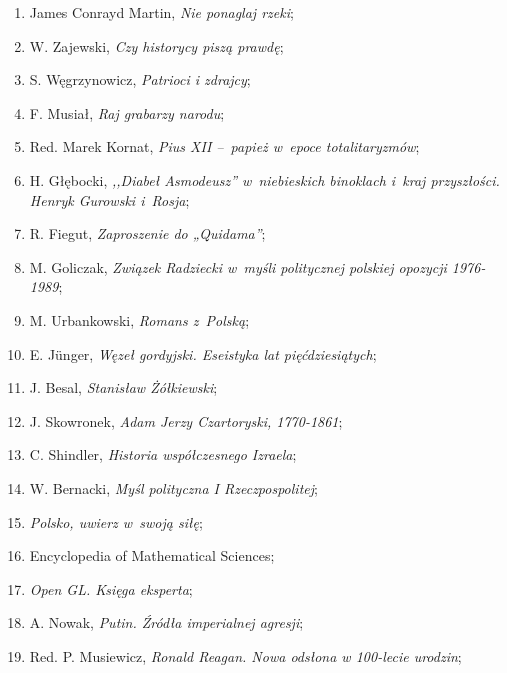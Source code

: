 \documentclass[a4paper,11pt]{article}
\begin{document}
\begin{enumerate}
\item James Conrayd Martin, \emph{Nie ponaglaj rzeki};

\item W. Zajewski, \emph{Czy historycy piszą prawdę};

\item S. Węgrzynowicz, \emph{Patrioci i zdrajcy};

\item F. Musiał, \emph{Raj grabarzy narodu};

\item Red. Marek Kornat, \emph{Pius XII --~papież w~epoce
    totalitaryzmów};

\item H. Głębocki, \emph{,,Diabeł Asmodeusz'' w~niebieskich binoklach
    i~kraj przyszłości. Henryk Gurowski i~Rosja};

\item R. Fiegut, \emph{Zaproszenie do „Quidama”};

\item M. Goliczak, \emph{Związek Radziecki w~myśli politycznej
    polskiej opozycji 1976-1989};

\item M. Urbankowski, \emph{Romans z~Polską};

\item E. J\"{u}nger, \emph{Węzeł gordyjski. Eseistyka lat
    pięćdziesiątych};

\item J. Besal, \emph{Stanisław Żółkiewski};

\item J. Skowronek, \emph{Adam Jerzy Czartoryski, 1770-1861};

\item C. Shindler, \emph{Historia współczesnego Izraela};

\item W. Bernacki, \emph{Myśl polityczna I Rzeczpospolitej};

\item \emph{Polsko, uwierz w~swoją siłę};

\item Encyclopedia of Mathematical Sciences;

\item \emph{Open GL. Księga eksperta};

\item A. Nowak, \emph{Putin. Źródła imperialnej agresji};

\item Red. P. Musiewicz, \emph{Ronald Reagan. Nowa odsłona w 100-lecie
    urodzin};


\end{enumerate}
\end{document}
